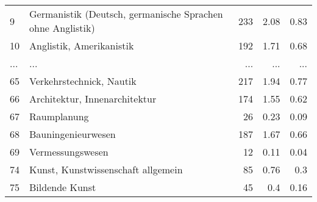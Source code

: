 \begin{longtable}{lXrrr}
        9 & \multicolumn{1}{X}{Germanistik (Deutsch, germanische Sprachen ohne Anglistik)} & %
          \num{233} &
          \num[round-mode=places,round-precision=2]{2.08} &
          \num[round-mode=places,round-precision=2]{0.83} \\
        10 & \multicolumn{1}{X}{Anglistik, Amerikanistik} & %
          \num{192} &
          \num[round-mode=places,round-precision=2]{1.71} &
          \num[round-mode=places,round-precision=2]{0.68} \\
       ... & ... & ... & ... & ... \\
        65 & \multicolumn{1}{X}{Verkehrstechnick, Nautik} & %
          \num{217} &
          \num[round-mode=places,round-precision=2]{1.94} &
          \num[round-mode=places,round-precision=2]{0.77} \\

        66 & \multicolumn{1}{X}{Architektur, Innenarchitektur} & %
          \num{174} &
          \num[round-mode=places,round-precision=2]{1.55} &
          \num[round-mode=places,round-precision=2]{0.62} \\

        67 & \multicolumn{1}{X}{Raumplanung} & %
          \num{26} &
          \num[round-mode=places,round-precision=2]{0.23} &
          \num[round-mode=places,round-precision=2]{0.09} \\

        68 & \multicolumn{1}{X}{Bauningenieurwesen} & %
          \num{187} &
          \num[round-mode=places,round-precision=2]{1.67} &
          \num[round-mode=places,round-precision=2]{0.66} \\

        69 & \multicolumn{1}{X}{Vermessungswesen} & %
          \num{12} &
          \num[round-mode=places,round-precision=2]{0.11} &
          \num[round-mode=places,round-precision=2]{0.04} \\

        74 & \multicolumn{1}{X}{Kunst, Kunstwissenschaft allgemein} & %
          \num{85} &
          \num[round-mode=places,round-precision=2]{0.76} &
          \num[round-mode=places,round-precision=2]{0.3} \\

        75 & \multicolumn{1}{X}{Bildende Kunst} & %
          \num{45} &
          \num[round-mode=places,round-precision=2]{0.4} &
          \num[round-mode=places,round-precision=2]{0.16} \\


\end{longtable}
